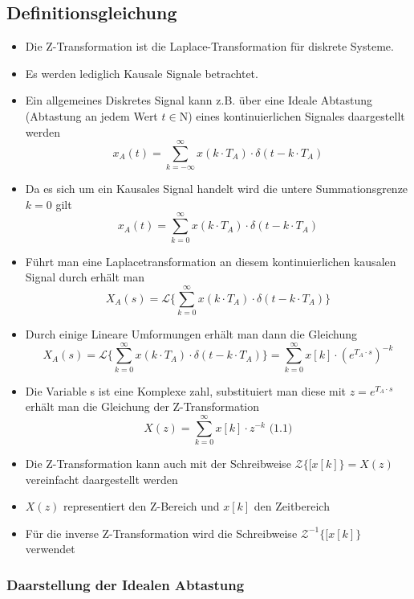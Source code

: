 \documentclass[11pt]{article}
\begin{document}
\subsection{Definitionsgleichung}\label{definitionsgleichung}

\begin{itemize}
\item
  Die Z-Transformation ist die Laplace-Transformation für diskrete
  Systeme.
\item
  Es werden lediglich Kausale Signale betrachtet.
\item
  Ein allgemeines Diskretes Signal kann z.B. über eine Ideale Abtastung
  (Abtastung an jedem Wert \(t \in\mathrm{N}\)) eines kontinuierlichen
  Signales daargestellt werden
  \[x_A(t)=\sum_{k=-\infty}^\infty x( k \cdot T_A ) \cdot \delta ( t - k \cdot T_A )\label{eq:xAti}\]
\item
  Da es sich um ein Kausales Signal handelt wird die untere
  Summationsgrenze \(k = 0\) gilt
  \[x_A(t)=\sum_{k=0}^\infty x( k \cdot T_A ) \cdot \delta ( t - k \cdot T_A )\label{eq:xAtn}\]
\item
  Führt man eine Laplacetransformation an diesem kontinuierlichen
  kausalen Signal durch erhält man
  \[X_A(s) = \mathcal{L}\{\sum_{k=0}^\infty x( k \cdot T_A ) \cdot \delta ( t - k \cdot T_A )\}\label{eq:xAs}\]
\item
  Durch einige Lineare Umformungen erhält man dann die Gleichung
  \[X_A(s) = \mathcal{L}\{\sum_{k=0}^\infty x( k \cdot T_A ) \cdot \delta ( t - k \cdot T_A )\} = \sum_{k=0}^\infty x[k] \cdot (e^{T_A \cdot s})^{-k}\label{eq:LxAk}\]
\item
  Die Variable s ist eine Komplexe zahl, substituiert man diese mit
  \(z = e^{T_A \cdot s}\label{eq:Zsubs}\) erhält man die Gleichung der
  Z-Transformation
  \[X(z) = \sum_{k=0}^\infty x[k] \cdot z^{-k}\textrm{  (1.1)}\]
\item
  Die Z-Transformation kann auch mit der Schreibweise
  \(\mathcal{Z}\{[x[k]\} = X(z)\) vereinfacht daargestellt werden
\item
  \(X(z)\) representiert den Z-Bereich und \(x[k]\) den Zeitbereich
\item
  Für die inverse Z-Transformation wird die Schreibweise
  \({\mathcal{Z}}^{-1}\{[x[k]\}\) verwendet
\end{itemize}

    \subsubsection{Daarstellung der Idealen
Abtastung}\label{daarstellung-der-idealen-abtastung}
\end{document}
